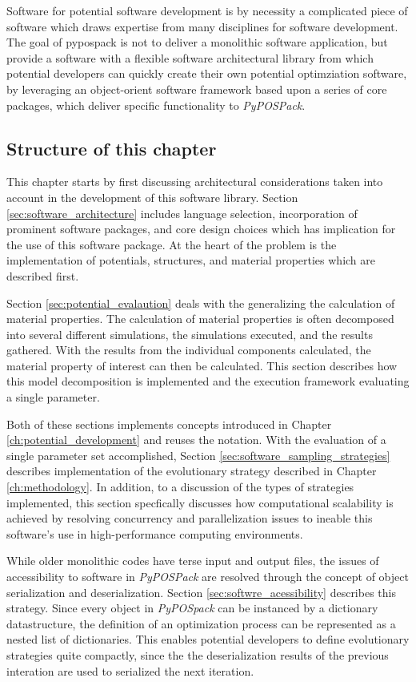 Software for potential software development is by necessity a complicated piece of software which draws expertise from many disciplines for software development.  The goal of pypospack is not to deliver a monolithic software application, but provide a software with a flexible software architectural library from which potential developers can quickly create their own potential optimziation software, by leveraging an object-orient software framework based upon a series of core packages, which deliver specific functionality to \emph{PyPOSPack}.

\subsection{Structure of this chapter}

This chapter starts by first discussing architectural considerations taken into account in the development of this software library.  Section \ref{sec:software_architecture} includes language selection, incorporation of prominent software packages, and core design choices which has implication for the use of this software package.  At the heart of the problem is the implementation of potentials, structures, and material properties which are described first.

Section \ref{sec:potential_evalaution} deals with the generalizing the calculation of material properties.  The calculation of material properties is often decomposed into several different simulations, the simulations executed, and the results gathered.  With the results from the individual components calculated, the material property of interest can then be calculated.  This section describes how this model decomposition is implemented and the execution framework evaluating a single parameter.

Both of these sections implements concepts introduced in Chapter \ref{ch:potential_development} and reuses the notation.  With the evaluation of a single parameter set accomplished, Section \ref{sec:software_sampling_strategies} describes implementation of the evolutionary strategy described in Chapter \ref{ch:methodology}.  In addition, to a discussion of the types of strategies implemented, this section specfically discusses how computational scalability is achieved by resolving concurrency and parallelization issues to ineable this software's use in high-performance computing environments.

While older monolithic codes have terse input and output files, the issues of accessibility to software in \emph{PyPOSPack} are resolved through the concept of object serialization and deserialization.  Section \ref{sec:softwre_acessibility} describes this strategy.  Since every object in \emph{PyPOSpack} can be instanced by a dictionary datastructure, the definition of an optimization process can be represented as a nested list of dictionaries.  This enables potential developers to define evolutionary strategies quite compactly, since the the deserialization results of the previous interation are used to serialized the next iteration.

